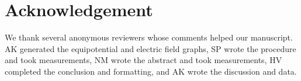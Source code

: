 ﻿\documentclass[10pt,journal,twoside]{IEEEtran}
\begin{document}
        
        
        
        
\section{Acknowledgement}
We thank several anonymous reviewers whose comments helped our manuscript. AK generated the equipotential and electric field graphs, SP wrote the procedure and took measurements, NM wrote the abstract and took measurements, HV completed the conclusion and formatting, and AK wrote the discussion and data.






\end{document}
